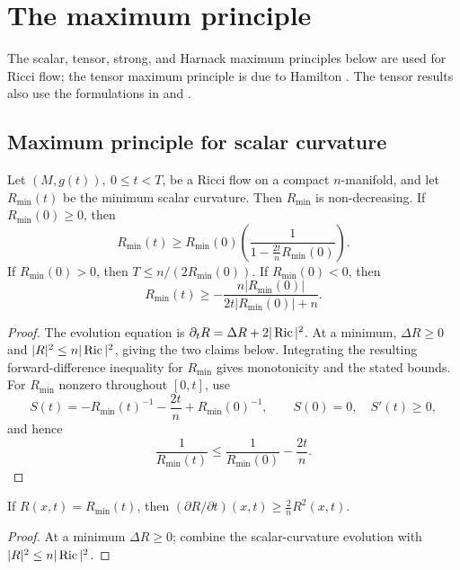 \chapter{The maximum principle}
\label{chap:maximum-principle}
\label{secmaxprin}

The scalar, tensor, strong, and Harnack maximum principles below are used
for Ricci flow; the tensor maximum principle is due to Hamilton
\cite{Hamilton4MPIC}. The tensor results also use the formulations in
\cite{Hamilton4MPCO} and \cite{ChowKnopf}.

\section{Maximum principle for scalar curvature}

\begin{proposition}
\label{prop:scalar-curvature-min-evolution}


\label{scalarevol}
Let $(M,g(t)),\ 0\le t<T$, be a Ricci flow on a compact
$n$-manifold, and let $R_\mathrm{min}(t)$ be the minimum scalar curvature.
Then $R_\mathrm{min}$ is non-decreasing. If $R_\mathrm{min}(0)\ge0$, then
\[
R_\mathrm{min}(t)\ge R_\mathrm{min}(0)\left(\frac{1}{1-\frac{2t}{n}R_\mathrm{min}(0)}\right).
\]
If $R_\mathrm{min}(0)>0$, then $T\le n/(2R_\mathrm{min}(0))$.
If $R_\mathrm{min}(0)<0$, then
\[
R_\mathrm{min}(t)\ge-\frac{n|R_\mathrm{min}(0)|}{2t|R_\mathrm{min}(0)|+n}.
\]
\end{proposition}
\begin{proof}

\sketch The evolution equation is $\partial_tR=\Delta R+2|\operatorname{Ric}|^2$.
At a minimum, $\Delta R\ge0$ and $|R|^2\le n|\operatorname{Ric}|^2$, giving
the two claims below. Integrating the resulting forward-difference inequality
for $R_\mathrm{min}$ gives monotonicity and the stated bounds. For
$R_\mathrm{min}$ nonzero throughout $[0,t]$, use
\[
S(t)=-R_\mathrm{min}(t)^{-1}-\frac{2t}{n}+R_\mathrm{min}(0)^{-1},
\qquad S(0)=0,\quad S'(t)\ge0,
\]
and hence
\begin{equation}\label{Rminineq}
\frac{1}{R_\mathrm{min}(t)}\le\frac{1}{R_\mathrm{min}(0)}-\frac{2t}{n}.
\end{equation}
\end{proof}

\begin{claim}
\label{claim:scalar-min-derivative-bound}

\label{firstclaim}
If $R(x,t)=R_\mathrm{min}(t)$, then
$(\partial R/\partial t)(x,t)\ge\frac{2}{n}R^2(x,t)$.
\end{claim}
\begin{proof}
\sketch At a minimum $\Delta R\ge0$; combine the scalar-curvature evolution
with $|R|^2\le n|\operatorname{Ric}|^2$.
\end{proof}

